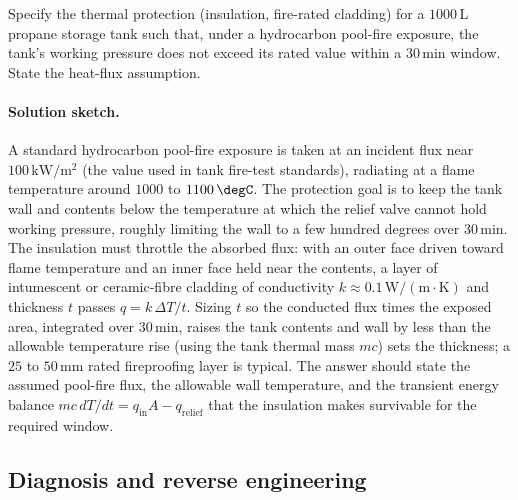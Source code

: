\begin{exercise}
Specify the thermal protection (insulation, fire-rated cladding) for
a $1000\,\text{L}$ propane storage tank such that, under a hydrocarbon
pool-fire exposure, the tank's working pressure does not exceed its
rated value within a $30\,\text{min}$ window. State the heat-flux
assumption.
\paragraph{Solution sketch.} A standard hydrocarbon pool-fire exposure
is taken at an incident flux near $100\,\text{kW}/\text{m}^2$ (the value
used in tank fire-test standards), radiating at a flame temperature
around $1000$ to $1100\,\degC$. The protection goal is to keep the tank
wall and contents below the temperature at which the relief valve cannot
hold working pressure, roughly limiting the wall to a few hundred
degrees over $30\,\text{min}$. The insulation must throttle the absorbed
flux: with an outer face driven toward flame temperature and an inner
face held near the contents, a layer of intumescent or ceramic-fibre
cladding of conductivity $k \approx 0.1\,\text{W}/(\text{m}\cdot
\si{\kelvin})$ and thickness $t$ passes $q = k\,\Delta T/t$. Sizing $t$
so the conducted flux times the exposed area, integrated over
$30\,\text{min}$, raises the tank contents and wall by less than the
allowable temperature rise (using the tank thermal mass $mc$) sets the
thickness; a $25$ to $50\,\si{\milli\meter}$ rated fireproofing layer is
typical. The answer should state the assumed pool-fire flux, the
allowable wall temperature, and the transient energy balance $mc\,
dT/dt = q_{\text{in}} A - q_{\text{relief}}$ that the insulation makes
survivable for the required window.
\end{exercise}

\subsection*{Diagnosis and reverse engineering}


